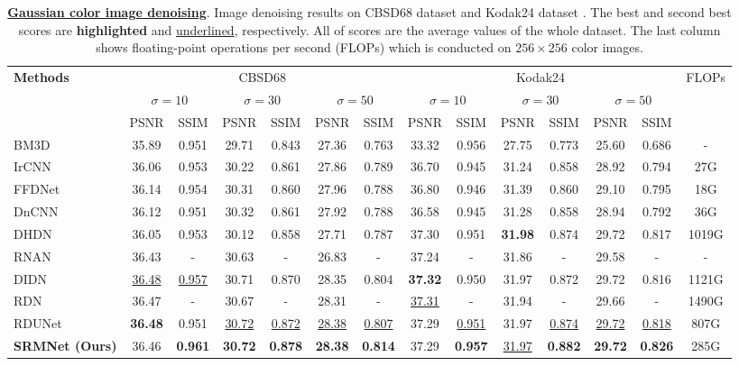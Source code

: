 \documentclass{article}
\begin{document}
\begin{table*}[!t] \footnotesize
\caption{\textbf{\underline{Gaussian color image denoising}}. Image denoising results on CBSD68 dataset \cite{35} and Kodak24 dataset \cite{36}. The best and second best scores are \textbf{highlighted} and \underline{underlined}, respectively. All of scores are the average values of the whole dataset. The last column shows floating-point operations per second (FLOPs) which is conducted on $256\times256$ color images.}
\label{denoise_table}
\begin{center}
\begin{tabular}{l  || cc | cc| cc || cc | cc| cc || c}
\toprule[1.5 pt]\multirow{3}{*}{\textbf{Methods}}&\multicolumn{6}{c||}{CBSD68 \cite{35}}&\multicolumn{6}{c||}{Kodak24 \cite{36}}&\multirow{3}{*}{FLOPs}\\
&\multicolumn{2}{c}{$\sigma = 10$}&\multicolumn{2}{c}{$\sigma = 30$}&\multicolumn{2}{c||}{$\sigma = 50$}&\multicolumn{2}{c}{$\sigma = 10$}&\multicolumn{2}{c}{$\sigma = 30$}&\multicolumn{2}{c||}{$\sigma = 50$}\\
&\multicolumn{1}{c}{PSNR}&\multicolumn{1}{c}{SSIM}&\multicolumn{1}{c}{PSNR}&\multicolumn{1}{c}{SSIM}&\multicolumn{1}{c}{PSNR}&\multicolumn{1}{c||}{SSIM}&\multicolumn{1}{c}{PSNR}&\multicolumn{1}{c}{SSIM}&\multicolumn{1}{c}{PSNR}&\multicolumn{1}{c}{SSIM}&\multicolumn{1}{c}{PSNR}&\multicolumn{1}{c||}{SSIM}\\
\midrule[1.5 pt]
BM3D \cite{01}
&35.89&0.951&29.71&0.843&27.36&0.763&33.32&0.956&27.75&0.773&25.60&0.686&-\\
IrCNN \cite{17}
&36.06&0.953&30.22&0.861&27.86&0.789&36.70&0.945&31.24&0.858&28.92&0.794&27G\\
FFDNet \cite{16}
&36.14&0.954&30.31&0.860&27.96&0.788&36.80&0.946&31.39&0.860&29.10&0.795&18G\\	
DnCNN \cite{04}
&36.12&0.951&30.32&0.861&27.92&0.788&36.58&0.945&31.28&0.858&28.94&0.792&36G\\
DHDN \cite{14}
&36.05&0.953&30.12&0.858&27.71&0.787&37.30&0.951&\textbf{31.98}&0.874&29.72&0.817&1019G\\
RNAN \cite{11}
&36.43&-&30.63&-&26.83&-&37.24&-&31.86&-&29.58&-&-\\
DIDN \cite{44}
&\underline{36.48}&\underline{0.957}&30.71&0.870&28.35&0.804&\textbf{37.32}&0.950&31.97&0.872&29.72&0.816&1121G\\
RDN \cite{07}&36.47&-&30.67&-&28.31&-&\underline{37.31}&-&31.94&-&29.66&-&1490G\\
RDUNet \cite{15}
&\textbf{36.48}&0.951&\underline{30.72}&\underline{0.872}&\underline{28.38}&\underline{0.807}&37.29&\underline{0.951}&31.97&\underline{0.874}&\underline{29.72}&\underline{0.818}&807G\\
\midrule[1.5 pt]
\textbf{SRMNet (Ours)}
&36.46&\textbf{0.961}&\textbf{30.72}&\textbf{0.878}&\textbf{28.38}&\textbf{0.814}&37.29&\textbf{0.957}&\underline{31.97}&\textbf{0.882}&\textbf{29.72}&\textbf{0.826}&285G\\
\bottomrule[1.5pt]
\end{tabular}
\end{center}
\end{table*}
\end{document}
